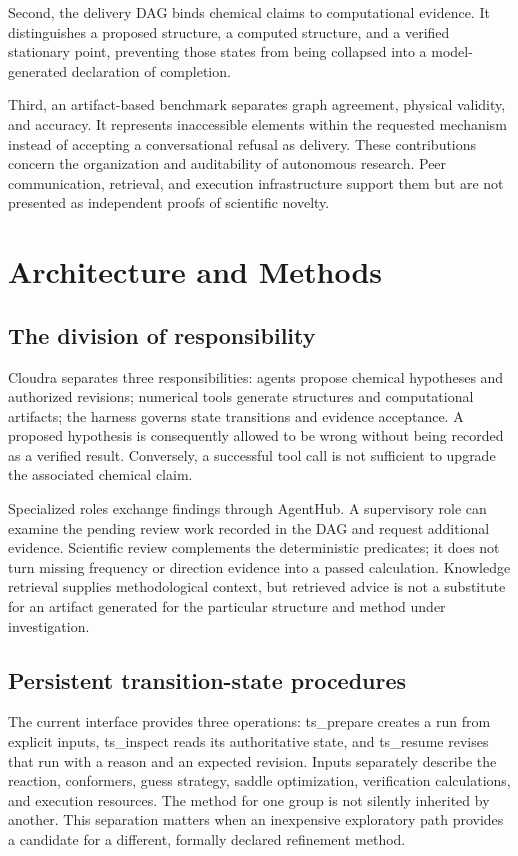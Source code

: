 \documentclass[11pt,a4paper]{article}
\begin{document}
Second, the delivery DAG binds chemical claims to computational evidence. It distinguishes a proposed structure, a computed structure, and a verified stationary point, preventing those states from being collapsed into a model-generated declaration of completion.

Third, an artifact-based benchmark separates graph agreement, physical validity, and accuracy. It represents inaccessible elements within the requested mechanism instead of accepting a conversational refusal as delivery. These contributions concern the organization and auditability of autonomous research. Peer communication, retrieval, and execution infrastructure support them but are not presented as independent proofs of scientific novelty.

\section{Architecture and Methods}

\subsection{The division of responsibility}
Cloudra separates three responsibilities: agents propose chemical hypotheses and authorized revisions; numerical tools generate structures and computational artifacts; the harness governs state transitions and evidence acceptance. A proposed hypothesis is consequently allowed to be wrong without being recorded as a verified result. Conversely, a successful tool call is not sufficient to upgrade the associated chemical claim.

Specialized roles exchange findings through AgentHub. A supervisory role can examine the pending review work recorded in the DAG and request additional evidence. Scientific review complements the deterministic predicates; it does not turn missing frequency or direction evidence into a passed calculation. Knowledge retrieval supplies methodological context, but retrieved advice is not a substitute for an artifact generated for the particular structure and method under investigation.

\subsection{Persistent transition-state procedures}
The current interface provides three operations: ts\_prepare creates a run from explicit inputs, ts\_inspect reads its authoritative state, and ts\_resume revises that run with a reason and an expected revision. Inputs separately describe the reaction, conformers, guess strategy, saddle optimization, verification calculations, and execution resources. The method for one group is not silently inherited by another. This separation matters when an inexpensive exploratory path provides a candidate for a different, formally declared refinement method.
\end{document}

